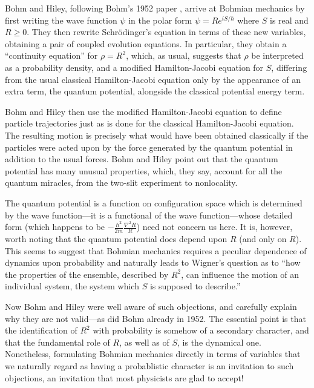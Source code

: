 Bohm and Hiley, following Bohm's 1952 paper \cite{Bohm52}, arrive at
Bohmian mechanics by first writing the wave function $\psi$ in the polar
form $\psi=Re^{iS/\hbar}$ where $S$ is real and $R\ge 0$. They then rewrite
Schr\"odinger's equation in terms of these new variables, obtaining a pair
of coupled evolution equations. In particular, they obtain a ``continuity
equation'' for $\rho=R^2$, which, as usual, suggests that $\rho$ be
interpreted as a probability density, and a modified Hamilton-Jacobi
equation for $S$, differing from the usual classical Hamilton-Jacobi
equation only by the appearance of an extra term, the quantum potential,
alongside the classical potential energy term.

Bohm and Hiley then use the modified Hamilton-Jacobi equation to define
particle trajectories just as is done for the classical Hamilton-Jacobi
equation. The resulting motion is precisely what would have been obtained
classically if the particles were acted upon by the force generated by the
quantum potential in addition to the usual forces. Bohm and Hiley point out
that the quantum potential has many unusual properties, which, they say,
account for all the quantum miracles, from the two-slit experiment to
nonlocality.

The quantum potential is a function on configuration space which is
determined by the wave function---it is a functional of the wave
function---whose detailed form (which happens to be
$-\frac{\hbar^2}{2m}\frac{\nabla^2R}{R}$) need not concern us here. It is,
however, worth noting that the quantum potential does depend upon $R$ (and
only on $R$). This seems to suggest that Bohmian mechanics requires a
peculiar dependence of dynamics upon probability and naturally leads to
Wigner's question \cite[page 290]{Wigner1} as to ``how the properties of
the ensemble, described by $R^2$, can influence the motion of an individual
system, the system which $S$ is supposed to describe.''

Now Bohm and Hiley were well aware of such objections, and carefully
explain why they are not valid---as did Bohm already in 1952. The essential
point is that the identification of $R^2$ with probability is somehow of a
secondary character, and that the fundamental role of $R$, as well as of $S$,
is the dynamical one. Nonetheless, formulating Bohmian mechanics directly
in terms of variables that we naturally regard as having a probablistic
character is an invitation to such objections, an invitation that most
physicists are glad to accept!

